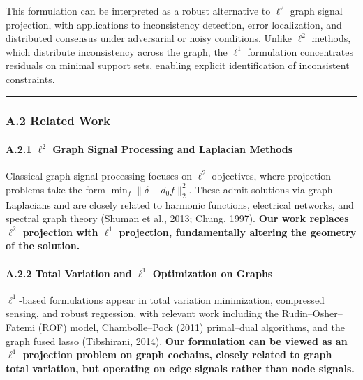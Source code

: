 \documentclass[
]{article}
\begin{document}
This formulation can be interpreted as a robust alternative to
\(\ell^2\) graph signal projection, with applications to inconsistency
detection, error localization, and distributed consensus under
adversarial or noisy conditions. Unlike \(\ell^2\) methods, which
distribute inconsistency across the graph, the \(\ell^1\) formulation
concentrates residuals on minimal support sets, enabling explicit
identification of inconsistent constraints.

\begin{center}\rule{0.5\linewidth}{0.5pt}\end{center}

\subsubsection{A.2 Related Work}\label{a.2-related-work}

\paragraph{\texorpdfstring{A.2.1 \(\ell^2\) Graph Signal Processing and
Laplacian
Methods}{A.2.1 \textbackslash ell\^{}2 Graph Signal Processing and Laplacian Methods}}\label{a.2.1-ell2-graph-signal-processing-and-laplacian-methods}

Classical graph signal processing focuses on \(\ell^2\) objectives,
where projection problems take the form
\(\min_f \|\delta - d_0 f\|_2^2\). These admit solutions via graph
Laplacians and are closely related to harmonic functions, electrical
networks, and spectral graph theory (Shuman et al., 2013; Chung, 1997).
\textbf{Our work replaces \(\ell^2\) projection with \(\ell^1\)
projection, fundamentally altering the geometry of the solution.}

\paragraph{\texorpdfstring{A.2.2 Total Variation and \(\ell^1\)
Optimization on
Graphs}{A.2.2 Total Variation and \textbackslash ell\^{}1 Optimization on Graphs}}\label{a.2.2-total-variation-and-ell1-optimization-on-graphs}

\(\ell^1\)-based formulations appear in total variation minimization,
compressed sensing, and robust regression, with relevant work including
the Rudin--Osher--Fatemi (ROF) model, Chambolle--Pock (2011)
primal--dual algorithms, and the graph fused lasso (Tibshirani, 2014).
\textbf{Our formulation can be viewed as an \(\ell^1\) projection
problem on graph cochains, closely related to graph total variation, but
operating on edge signals rather than node signals.}
\end{document}
